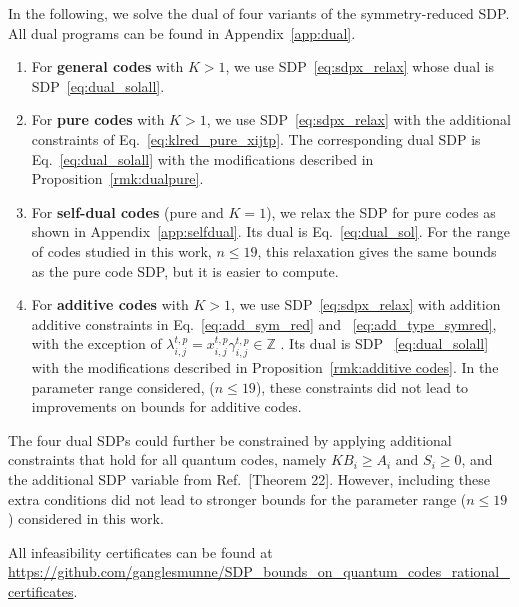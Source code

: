 \documentclass[12pt,a4paper]{amsart}
\begin{document}
In the following, we solve the dual of four variants of the symmetry-reduced SDP. All dual programs can be found in Appendix~\ref{app:dual}.
\begin{enumerate}[label=(\alph*)]
\setlength{\itemsep}{3pt}

\item For {\bf general codes} with $K>1$, we use SDP~\eqref{eq:sdpx_relax} whose dual is SDP~\eqref{eq:dual_solall}.

\item 
For {\bf pure codes} with $K>1$, we use SDP~\eqref{eq:sdpx_relax}
with the additional constraints of
Eq.~\eqref{eq:klred_pure_xijtp}.
The corresponding dual SDP is Eq.~\eqref{eq:dual_solall} 
with the modifications described in 
Proposition~\ref{rmk:dualpure}.


\item For {\bf self-dual codes} (pure and $K=1$), we relax the SDP for pure codes as shown in Appendix~\ref{app:selfdual}. Its dual is Eq.~\eqref{eq:dual_sol}. For the range of codes studied in this work, $n\leq 19$, this relaxation gives the same bounds as the pure code SDP, 
but it is easier to compute.

\item  For {\bf additive codes} with $K>1$, we use SDP~\eqref{eq:sdpx_relax} with addition  additive constraints in Eq.~\eqref{eq:add_sym_red} and
~\eqref{eq:add_type_symred}, with the exception of $\lambda^{t,p}_{i,j} = x^{t,p}_{i,j}\gamma^{t,p}_{i,j}\in \mathbb{Z}$ . 
Its dual is SDP ~\eqref{eq:dual_solall} 
with the modifications described in 
Proposition~\ref{rmk:additive codes}.
In the parameter range considered,
($n \leq 19$),
these constraints did not lead to improvements on bounds for additive codes.  



\end{enumerate}



The four dual SDPs could further be constrained by applying additional constraints that hold for all quantum codes, 
namely  
$KB_i \geq A_i$ and $S_i \geq 0$,
and the additional SDP variable from Ref.~\cite{munne2025sdpboundsquantumcodes}[Theorem 22].
% 
However, including these extra conditions
did not lead to stronger bounds for the parameter range ($n \leq 19$) considered in this work.

All infeasibility certificates can be found at \url{https://github.com/ganglesmunne/SDP_bounds_on_quantum_codes_rational_certificates}.
\end{document}
